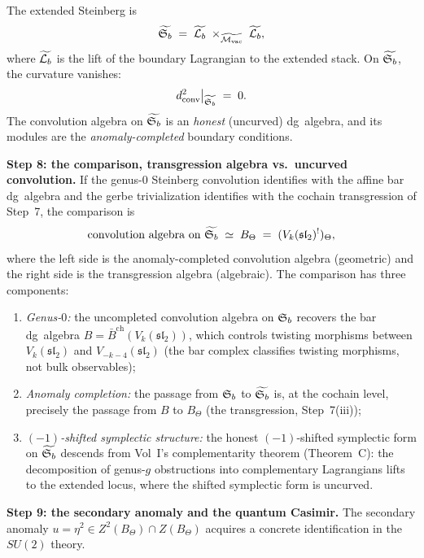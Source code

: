 \begin{construction}
The extended Steinberg is
\begin{equation}\label{eq:su2-extended-steinberg}
\widetilde{\mathfrak{S}_b}
\;=\;
\widetilde{\mathcal{L}_b}
\;\times_{\widetilde{\mathcal{M}_{\mathrm{vac}}}}\;
\widetilde{\mathcal{L}_b},
\end{equation}
where $\widetilde{\mathcal{L}_b}$ is the lift of the boundary Lagrangian to the
extended stack. On $\widetilde{\mathfrak{S}_b}$, the curvature vanishes:
\[
d^2_{\mathrm{conv}}\big|_{\widetilde{\mathfrak{S}_b}} \;=\; 0.
\]
The convolution algebra on $\widetilde{\mathfrak{S}_b}$ is an \emph{honest}
(uncurved) dg~algebra, and its modules are the
\emph{anomaly-completed} boundary conditions.

\medskip
\noindent\textbf{Step 8: the comparison, transgression algebra
vs.\ uncurved convolution.}
If the genus-$0$ Steinberg convolution identifies with the affine
bar dg~algebra and the gerbe trivialization identifies with the
cochain transgression of Step~7, the comparison is
\begin{equation}\label{eq:su2-comparison}
\text{convolution algebra on }\widetilde{\mathfrak{S}_b}
\;\simeq\;
B_\Theta
\;=\;
(V_k(\mathfrak{sl}_2)^!)_\Theta,
\end{equation}
where the left side is the anomaly-completed convolution algebra
(geometric) and the right side is the transgression algebra
(algebraic). The comparison has three components:
\begin{enumerate}[label=\textup{(\alph*)}]
\item \emph{Genus-$0$:} the uncompleted convolution algebra on $\mathfrak{S}_b$
 recovers the bar dg~algebra $B = \bar B^{\mathrm{ch}}(V_k(\mathfrak{sl}_2))$,
 which controls twisting morphisms between $V_k(\mathfrak{sl}_2)$ and
 $V_{-k-4}(\mathfrak{sl}_2)$ (the bar complex classifies
 twisting morphisms, not bulk observables);
\item \emph{Anomaly completion:} the passage from $\mathfrak{S}_b$ to
 $\widetilde{\mathfrak{S}_b}$ is, at the cochain level, precisely the passage
 from $B$ to $B_\Theta$ (the transgression, Step~7(iii));
\item \emph{$(-1)$-shifted symplectic structure:} the honest
 $(-1)$-shifted symplectic form on $\widetilde{\mathfrak{S}_b}$ descends from
 Vol~I's complementarity theorem (Theorem~C): the
 decomposition of genus-$g$ obstructions into complementary
 Lagrangians lifts to the extended locus, where the shifted
 symplectic form is uncurved.
\end{enumerate}

\medskip
\noindent\textbf{Step 9: the secondary anomaly and the quantum
Casimir.}
The secondary anomaly $u = \eta^2\in Z^2(B_\Theta)\cap Z(B_\Theta)$
acquires a concrete identification in the $SU(2)$ theory.


\end{construction}
